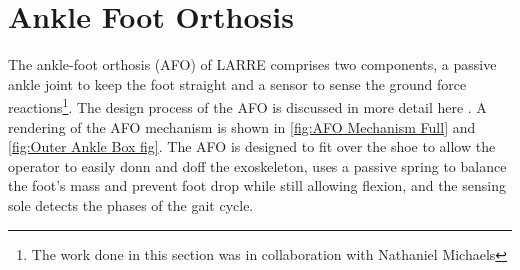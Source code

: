 
\section{Ankle Foot Orthosis}
\label{sec:ankle}

The ankle-foot orthosis (AFO) of LARRE comprises two components, a passive ankle joint to keep the foot straight and a sensor to sense the ground force reactions\footnote{The work done in this section was in collaboration with Nathaniel Michaels}. The design process of the AFO is discussed in more detail here \cite{Michaels2020}. A rendering of the AFO mechanism is shown in \autoref{fig:AFO Mechanism Full} and \autoref{fig:Outer Ankle Box fig}. The AFO is designed to fit over the shoe to allow the operator to easily donn and doff the exoskeleton, uses a passive spring to balance the foot's mass and prevent foot drop while still allowing flexion, and the sensing sole detects the phases of the gait cycle. 

